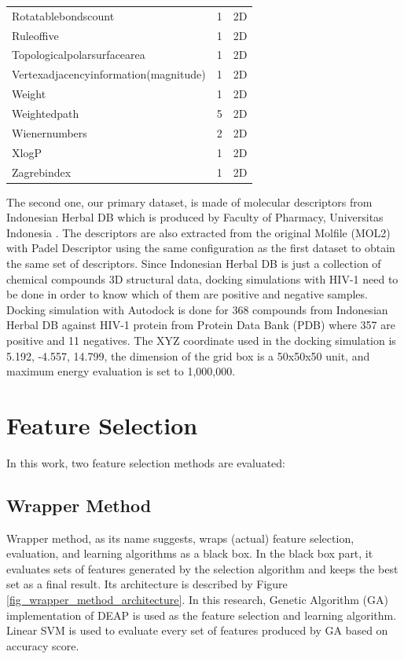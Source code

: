 \documentclass[conference]{IEEEtran}
\begin{document}
\begin{table}
\begin{tabular}{|l|c|c|}
		Rotatablebondscount & 	1  & 2D \\
		Ruleoffive & 	1  & 2D \\
		Topologicalpolarsurfacearea & 	1  & 2D \\
		Vertexadjacencyinformation(magnitude) & 	1  & 2D \\
		Weight & 	1  & 2D \\
		Weightedpath & 	5  & 2D \\
		Wienernumbers & 	2  & 2D \\
		XlogP & 	1  & 2D \\
		Zagrebindex & 	1  & 2D \\	
		\hline 
	\end{tabular} 
\end{table}	

The second one, our primary dataset, is made of molecular descriptors from Indonesian Herbal DB which is produced by Faculty of Pharmacy, Universitas Indonesia \cite{yanuar2011medicinal}. The descriptors are also extracted from the original Molfile (MOL2) with Padel Descriptor using the same configuration as the first dataset to obtain the same set of descriptors. Since Indonesian Herbal DB is just a collection of chemical compounds 3D structural data, docking simulations with HIV-1 need to be done in order to know which of them are positive and negative samples. Docking simulation with Autodock is done for 368 compounds from Indonesian Herbal DB against HIV-1 protein from Protein Data Bank (PDB) where 357 are positive and 11 negatives. The XYZ coordinate used in the docking simulation is 5.192, -4.557, 14.799, the dimension of the grid box is a 50x50x50 unit, and maximum energy evaluation is set to 1,000,000.

\section{Feature Selection} \label{Feature Selection}

In this work, two feature selection methods are evaluated:

\subsection{Wrapper Method}

Wrapper method, as its name suggests, wraps (actual) feature selection, evaluation, and learning algorithms as a black box\cite{tang2014feature}. In the black box part, it evaluates sets of features generated by the selection algorithm and keeps the best set as a final result. Its architecture is described by Figure \ref{fig_wrapper_method_architecture}. In this research, Genetic Algorithm (GA) implementation of DEAP \cite{DEAP_JMLR2012} is used as the feature selection and learning algorithm. Linear SVM is used to evaluate every set of features produced by GA based on accuracy score.
\end{document}
